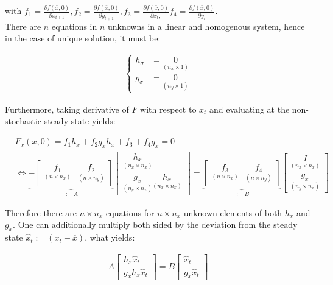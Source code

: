 \documentclass{pracamgr}
\numberwithin{equation}{section}
\begin{document}
with $f_1= \frac{\partial f (\bar{x}, 0)}{\partial x_{t+1}}, f_2=  \frac{\partial f (\bar{x}, 0)}{\partial y_{t+1}},  f_3=\frac{\partial f (\bar{x}, 0)}{\partial x_{t},}  f_4=\frac{\partial f (\bar{x}, 0)}{\partial y_{t}}$. \\

There are $n$ equations in $n$ unknowns in a linear and homogenous system, hence in the case of unique solution, it must be:

\begin{align}
\left\{
\begin{array}{cl}
h_\sigma &= \underset{(n_x\times 1)}{0} \\
g_\sigma &= \underset{(n_y \times 1)}{0} 
\end{array}
\right.
\end{align}

Furthermore, taking derivative of $F$ with respect to $x_t$ and evaluating at the non-stochastic steady state yields:

\begin{eqnarray}
&    F_x (\overline{x},0) = f_1 h_x + f_2 g_x h_x + f_3 + f_4 g_x = 0 \nonumber \\
& \iff \underbrace{- \begin{bmatrix} \underset{(n\times n_x)}{f_1} & \underset{(n\times n_y)}{f_2} \end{bmatrix}}_{:=A} \begin{bmatrix} \underset{(n_x\times n_x)}{h_x} \\ \underset{(n_y\times n_x)}{g_x} \underset{(n_x\times n_x)}{h_x} \end{bmatrix}  = \underbrace{\begin{bmatrix} \underset{(n\times n_x)}{f_3} & \underset{(n\times n_y)}{f_4}\end{bmatrix}}_{:=B} \begin{bmatrix} \underset{(n_x\times n_x)}{I} \\\underset{(n_y\times n_x)}{g_x} \end{bmatrix}
\end{eqnarray}
  
Therefore there are $n\times n_x$ equations for $n\times n_x$ unknown elements of both $h_x$ and $g_x$. One can additionally multiply both sided by the deviation from the steady state $\widehat{x}_t := (x_t-\overline{x})$, what yields:

 \begin{align}
 A \begin{bmatrix} h_x \widehat{x}_t \\ g_x h_x \widehat{x}_t \end{bmatrix} = B \begin{bmatrix} \widehat{x}_t \\ g_x \widehat{x}_t \end{bmatrix}
  \end{align}
\end{document}
